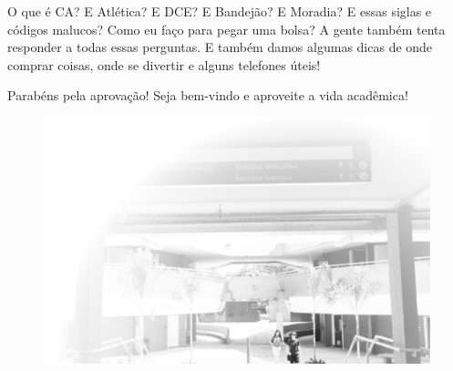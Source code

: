 O que é CA? E Atlética? E DCE? E Bandejão? E Moradia? E essas siglas e códigos
malucos? Como eu faço para pegar uma bolsa? A gente também tenta responder a todas
essas perguntas. E também damos algumas dicas de onde comprar coisas, onde se
divertir e alguns telefones úteis!

Parabéns pela aprovação! Seja bem-vindo e aproveite a vida acadêmica!

\begin{figure}[hb!]
    \includegraphics[scale=0.68, keepaspectratio=true]{img/imgs/1-boas_vindas/-007.jpg}
\end{figure}


